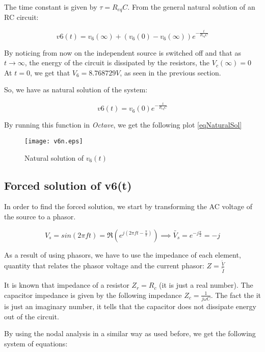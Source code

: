 The time constant is given by $\tau = R_{eq}C$.
From the general natural solution of an RC circuit:

\begin{equation}
  v6 (t) = v_6(\infty) + (v_6(0) - v_6(\infty)) e^{-\frac{t}{R_{eq}C}}
\end{equation}


By noticing from now on the independent source is switched off and that as $t \rightarrow \infty$, the energy of the circuit is dissipated by the resistors, the $V_c(\infty) = 0$
At $t = 0$, we get that $V_6 = 8.768729V$, as seen in the previous section.

So, we have as natural solution of the system:

\begin{equation}
  v6 (t) = v_6(0)e^{-\frac{t}{R_{eq}C}}
  \label{eqNaturalSol}
\end{equation}

By running this function in \textit{Octave}, we get the following plot \ref{eqNaturalSol}

\begin{figure}[h] \centering
  \texttt{[image: v6n.eps]}
  \caption{Natural solution of $v_6(t)$ }
  \label{fig:naturalSolution}
\end{figure}


\subsection{Forced solution of v6(t)}

In order to find the forced solution, we start by transforming the AC voltage of the source to a phasor.

\begin{equation}
  V_s = sin(2\pi f t) = \Re (e^{j(2\pi f t - \frac{\pi}{2})}) \implies \tilde{V_s} = e^{-j \frac{\pi}{2}} = -j
\end{equation}

As a result of using phasors, we have to use the impedance of each element, quantity that relates the phasor voltage and the current phasor: $Z = \frac{\tilde{V}}{\tilde{I}} $

It is known that impedance of a resistor $Z_r = R_c$ (it is just a real number). The capacitor impedance is given by the following impedance $Z_c = \frac{1}{j\omega C}$.
The fact the it is just an imaginary number, it tells that the capacitor does not dissipate energy out of the circuit.

By using the nodal analysis in a similar way as used before, we get the following system of equations:

